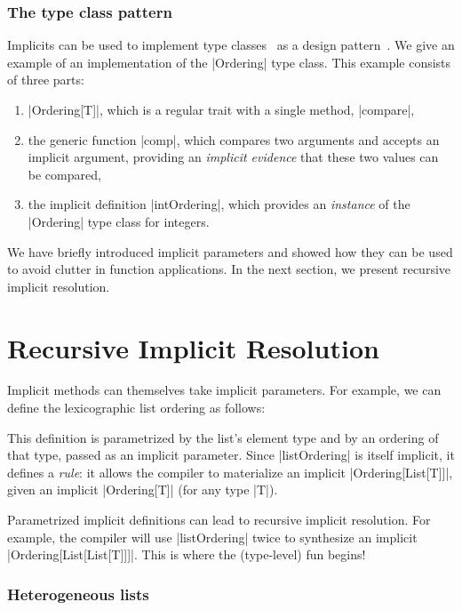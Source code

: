 \subsubsection{The type class pattern}

Implicits can be used to implement type classes~\citep{wadler1989how} as a design pattern~\citep{oliveira2010type}.
We give an example of an implementation of the |Ordering| type class.
This example consists of three parts:

\begin{enumerate}
  \item |Ordering[T]|, which is a regular trait with a single method, |compare|,
  \item the generic function |comp|, which compares two arguments and accepts an implicit argument, providing an \emph{implicit evidence} that these two values can be compared,
  \item the implicit definition |intOrdering|, which provides an \emph{instance} of the |Ordering| type class for integers.
\end{enumerate}

\ordExample

We have briefly introduced implicit parameters and showed how they can be used to avoid clutter in function applications.
In the next section, we present recursive implicit resolution.

\section{Recursive Implicit Resolution}
\label{sec:recursive-implicit-resolution}

Implicit methods can themselves take implicit parameters.
For example, we can define the lexicographic list ordering as follows:

\ordListExample

\noindent
This definition is parametrized by the list's element type and by an ordering of that type, passed as an implicit parameter.
Since |listOrdering| is itself implicit, it defines a \emph{rule}: it allows the compiler to materialize an implicit |Ordering[List[T]]|, given an implicit |Ordering[T]| (for any type |T|).

Parametrized implicit definitions can lead to recursive implicit resolution. For example, the compiler will use |listOrdering| twice to synthesize an implicit |Ordering[List[List[T]]]|.
This is where the (type-level) fun begins!

\subsubsection{Heterogeneous lists}

